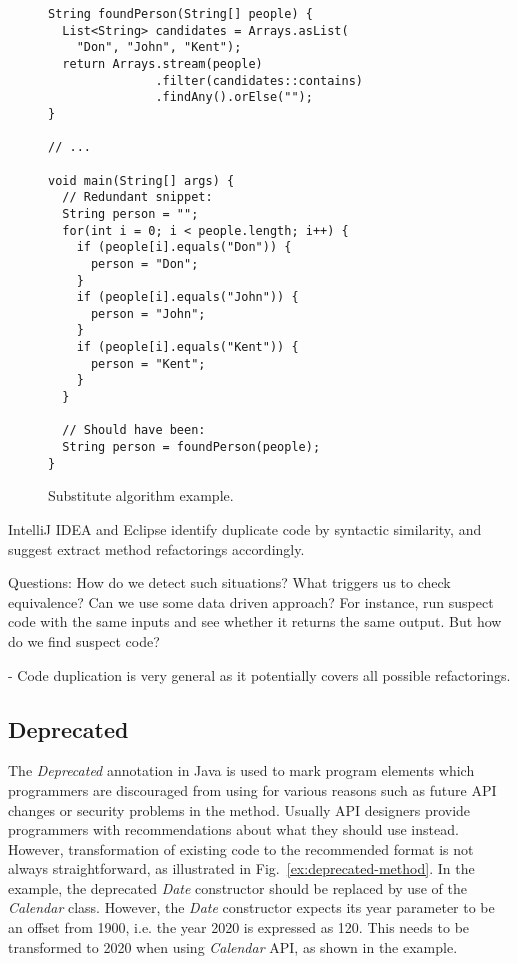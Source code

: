 \documentclass[runningheads,a4paper]{llncs}
\begin{document}
\begin{figure}
\begin{lstlisting}[mathescape=true,showstringspaces=false]
String foundPerson(String[] people) {
  List<String> candidates = Arrays.asList(
    "Don", "John", "Kent");
  return Arrays.stream(people)
               .filter(candidates::contains)
               .findAny().orElse("");
}

// ...

void main(String[] args) {
  // Redundant snippet:
  String person = "";
  for(int i = 0; i < people.length; i++) {
    if (people[i].equals("Don")) {
      person = "Don";
    }
    if (people[i].equals("John")) {
      person = "John";
    }
    if (people[i].equals("Kent")) {
      person = "Kent";
    }
  }

  // Should have been:
  String person = foundPerson(people);
}
\end{lstlisting}
\caption{Substitute algorithm example.}
\label{ex:substitute-algorithm}
\end{figure}

IntelliJ IDEA and Eclipse identify duplicate code by syntactic similarity, and
suggest extract method refactorings accordingly.


Questions: How do we detect such situations? What triggers us to check
equivalence? Can we use some data driven approach? For instance, run
suspect code with the same inputs and see whether it returns the same
output. But how do we find suspect code?

- Code duplication is very general as it potentially covers all possible
refactorings.

\subsection{Deprecated}

The {\em Deprecated} annotation in Java is used to mark program elements which
programmers are discouraged from using for various reasons such as future API
changes or security problems in the method. Usually API designers provide
programmers with recommendations about what they should use instead. However,
transformation of existing code to the recommended format is not always
straightforward, as illustrated in Fig.~\ref{ex:deprecated-method}. In the
example, the deprecated {\em Date} constructor should be replaced by use of the
{\em Calendar} class. However, the {\em Date} constructor expects its year
parameter to be an offset from 1900, i.e. the year 2020 is expressed as 120.
This needs to be transformed to 2020 when using {\em Calendar} API, as shown in
the example.
\end{document}

